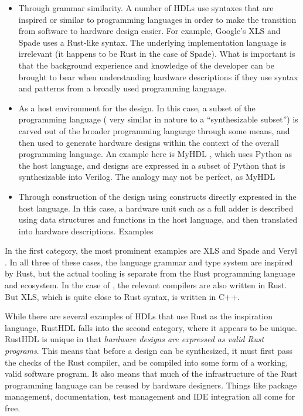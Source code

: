 \documentclass[conference]{IEEEtran}
\begin{document}
\begin{itemize}
  \item Through grammar similarity.  A number of HDLs use syntaxes that are inspired or similar to
  programming languages in order to make the transition from software to hardware design easier.
  For example, Google's XLS\cite{b4} and Spade \cite{b1} uses a Rust-like syntax.
  The underlying implementation language is irrelevant (it happens to be Rust in the case of Spade).
  What is important is that the background experience and knowledge of the developer can be brought 
  to bear when understanding hardware descriptions if they use syntax and patterns from a broadly
  used programming language.
  \item As a host environment for the design.  In this case, a subset of the programming language (
    very similar in nature to a ``synthesizable subset'') is carved out of the broader programming language
    through some means, and then used to generate hardware designs within the context of the overall
    programming language.  An example here is MyHDL \cite{b3}, which uses Python as the host language, and 
    designs are expressed in a subset of Python that is synthesizable into Verilog.  The analogy may
    not be perfect, as MyHDL 
  \item Through construction of the design using constructs directly expressed in the host language.
  In this case, a hardware unit such as a full adder is described using data structures and 
  functions in the host language, and then translated into hardware descriptions.  Examples

\end{itemize}

In the first category, the most prominent examples are XLS \cite{b4} and Spade \cite{b1} and Veryl \cite{b5}.  
In all three of these cases, the language grammar and type system are inspired by Rust, but 
the actual tooling is separate from the Rust programming language and ecosystem.  In the case of 
\cite{b1, b5}, the relevant compilers are also written in Rust.  But XLS, which is quite close to 
Rust syntax, is written in C++.

While there are several examples of HDLs that use Rust as the inspiration language, RustHDL falls 
into the second category, where it appears to be unique.  
RustHDL is unique in that \emph{hardware designs are expressed as valid Rust programs}.
This means that before a design can be synthesized, it must first pass the checks of the Rust
compiler, and be compiled into some form of a working, valid software program.
It also means that much of the infrastructure of the Rust programming language can be reused
by hardware designers.  Things like package management, documentation, test management and IDE 
integration all come for free.
\end{document}

